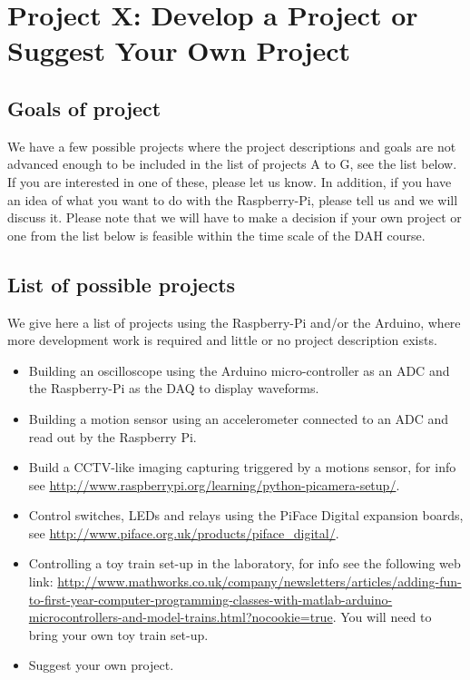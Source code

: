 

\newpage
\section{Project X: Develop a Project or Suggest Your Own Project}

\subsection{Goals of project}

We have a few possible projects where the project descriptions and goals are not advanced enough to be included in the list of projects A to G, see the list below. If you are interested in one of these, please let us know. In addition, if you have an idea of what you want to do with the Raspberry-Pi, please tell us and we will discuss it. Please note that we will have to make a decision if your own project or one from the list below is feasible within the time scale of the DAH course.


\subsection{List of possible projects}

We give here a list of projects using the Raspberry-Pi and/or the Arduino, where more development work is required and little or no project description exists. 

\begin{itemize}
\item Building an oscilloscope using the Arduino micro-controller as an ADC and the Raspberry-Pi as the DAQ to display waveforms.
\item Building a motion sensor using an accelerometer connected to an ADC and read out by the Raspberry Pi.
\item Build a CCTV-like imaging capturing triggered by a motions sensor, for info see 
\url{http://www.raspberrypi.org/learning/python-picamera-setup/}.
\item Control switches, LEDs and relays using the PiFace Digital expansion boards, see 
\url{http://www.piface.org.uk/products/piface_digital/}.
\item Controlling a toy train set-up in the laboratory, for info see the following web link: 
\url{http://www.mathworks.co.uk/company/newsletters/articles/adding-fun-to-first-year-computer-programming-classes-with-matlab-arduino-microcontrollers-and-model-trains.html?nocookie=true}.
You will need to bring your own toy train set-up.
\item Suggest your own project.
\end{itemize}




